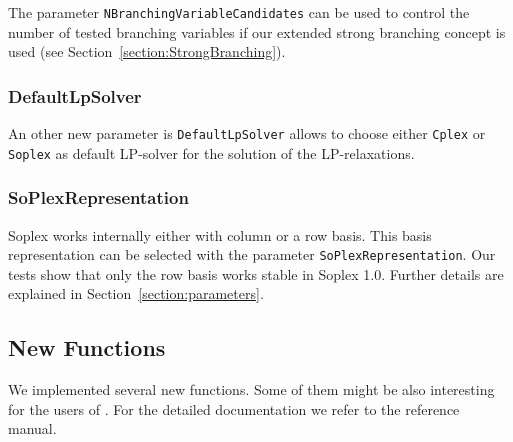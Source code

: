 The parameter
{\tt NBranchingVariableCandidates}
can be
used to control the number of tested branching variables if our
extended strong branching concept is used (see
Section~\ref{section:StrongBranching}).

\subsubsection{DefaultLpSolver}

An other new parameter is 
{\tt DefaultLpSolver} allows
to choose either {\tt Cplex} or {\tt Soplex} as default
LP-solver for the solution of the LP-relaxations.

\subsubsection{SoPlexRepresentation}

Soplex works internally either with column or a row basis. This basis
representation can be selected with the parameter 
{\tt SoPlexRepresentation}.
Our tests show that only the row basis works stable in Soplex 1.0.
Further details are explained in Section~\ref{section:parameters}.


\subsection{New Functions}

We implemented several new functions. Some of them might be also
interesting for the users of \ABACUS. For the detailed documentation we
refer to the reference manual.

